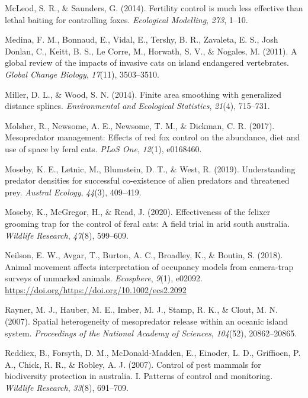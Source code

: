 \documentclass[]{elsarticle} %
\begin{document}
\leavevmode\hypertarget{ref-mcleod2014}{}%
McLeod, S. R., \& Saunders, G. (2014). Fertility control is much less effective than lethal baiting for controlling foxes. \emph{Ecological Modelling}, \emph{273}, 1--10.

\leavevmode\hypertarget{ref-medina2011}{}%
Medina, F. M., Bonnaud, E., Vidal, E., Tershy, B. R., Zavaleta, E. S., Josh Donlan, C., Keitt, B. S., Le Corre, M., Horwath, S. V., \& Nogales, M. (2011). A global review of the impacts of invasive cats on island endangered vertebrates. \emph{Global Change Biology}, \emph{17}(11), 3503--3510.

\leavevmode\hypertarget{ref-miller2014}{}%
Miller, D. L., \& Wood, S. N. (2014). Finite area smoothing with generalized distance splines. \emph{Environmental and Ecological Statistics}, \emph{21}(4), 715--731.

\leavevmode\hypertarget{ref-molsher2017}{}%
Molsher, R., Newsome, A. E., Newsome, T. M., \& Dickman, C. R. (2017). Mesopredator management: Effects of red fox control on the abundance, diet and use of space by feral cats. \emph{PLoS One}, \emph{12}(1), e0168460.

\leavevmode\hypertarget{ref-moseby2019}{}%
Moseby, K. E., Letnic, M., Blumstein, D. T., \& West, R. (2019). Understanding predator densities for successful co-existence of alien predators and threatened prey. \emph{Austral Ecology}, \emph{44}(3), 409--419.

\leavevmode\hypertarget{ref-moseby2020effectiveness}{}%
Moseby, K., McGregor, H., \& Read, J. (2020). Effectiveness of the felixer grooming trap for the control of feral cats: A field trial in arid south australia. \emph{Wildlife Research}, \emph{47}(8), 599--609.

\leavevmode\hypertarget{ref-https:ux2fux2fdoi.orgux2f10.1002ux2fecs2.2092}{}%
Neilson, E. W., Avgar, T., Burton, A. C., Broadley, K., \& Boutin, S. (2018). Animal movement affects interpretation of occupancy models from camera-trap surveys of unmarked animals. \emph{Ecosphere}, \emph{9}(1), e02092. \url{https://doi.org/https://doi.org/10.1002/ecs2.2092}

\leavevmode\hypertarget{ref-rayner2007}{}%
Rayner, M. J., Hauber, M. E., Imber, M. J., Stamp, R. K., \& Clout, M. N. (2007). Spatial heterogeneity of mesopredator release within an oceanic island system. \emph{Proceedings of the National Academy of Sciences}, \emph{104}(52), 20862--20865.

\leavevmode\hypertarget{ref-reddiex2007}{}%
Reddiex, B., Forsyth, D. M., McDonald-Madden, E., Einoder, L. D., Griffioen, P. A., Chick, R. R., \& Robley, A. J. (2007). Control of pest mammals for biodiversity protection in australia. I. Patterns of control and monitoring. \emph{Wildlife Research}, \emph{33}(8), 691--709.
\end{document}
